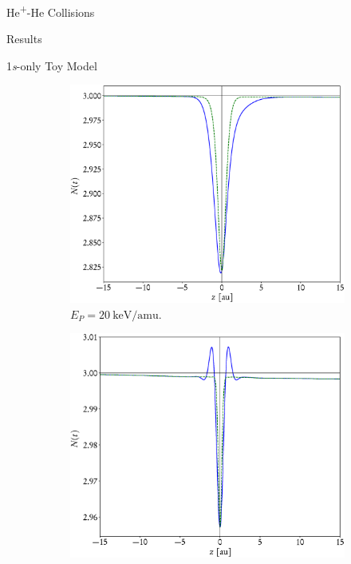 \documentclass[letterpaper, 11 pt]{report}
\begin{document}
\begin{chapter}{\texorpdfstring{He\textsuperscript{+}}{He+}-He Collisions \label{chap:hephe}}
\begin{section}{Results \label{sec:hephe-disc}}
\begin{subsection}{1\textit{s}-only Toy Model \label{sec:toy}}
         \begin{figure}[t]
            \centering
            \begin{subfigure}{.5\textwidth}
               \centering
               \includegraphics[width=\linewidth]{./images/toymodel/dNorm-1s-20.eps}
               \caption{$E_P = 20~\mathrm{keV}/\mathrm{amu}$. \label{fig:toy20}}
            \end{subfigure}%
            \begin{subfigure}{.5\textwidth}
               \centering
               \includegraphics[width=\linewidth]{./images/toymodel/dNorm-1s-1000.eps}

\end{subfigure}
\end{figure}
\end{subsection}
\end{section}
\end{chapter}
\end{document}
